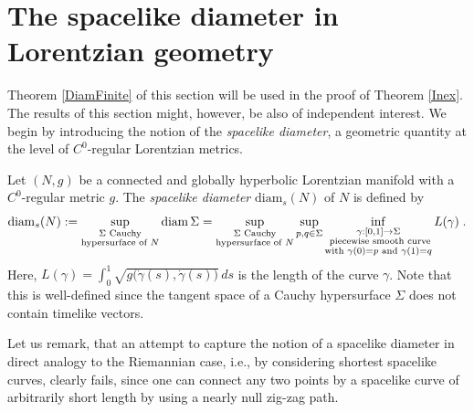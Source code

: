 \documentclass[reqno]{article}
\newcommand{\diam}{\mathrm{diam}}
\begin{document}
\section{The spacelike diameter in Lorentzian geometry}
\label{SecDiam}

Theorem \ref{DiamFinite} of this section will be used in the proof of Theorem \ref{Inex}. The results of this section might, however, be also of independent interest. We begin by introducing the notion of the \emph{spacelike diameter}, a geometric quantity at the level of $C^0$-regular Lorentzian metrics.

\begin{definition}\label{schwdef:spacelike_diameter}
Let $(N,g)$ be a connected  and globally hyperbolic Lorentzian manifold with a $C^0$-regular metric $g$. The \emph{spacelike diameter}  $\diam_s(N)$ of $N$ is defined by 
\begin{equation*}
\diam_s(N) := \sup_{\substack{\Sigma \textnormal{ Cauchy} \\ \textnormal{hypersurface of } N}} \diam\, \Sigma = \sup_{\substack{\Sigma \textnormal{ Cauchy} \\  \textnormal{hypersurface of } N}} \sup_{p,q \in \Sigma} \inf_{\substack{\gamma : [0,1] \to \Sigma \\ \textnormal{ piecewise smooth curve} \\  \textnormal{with } \gamma(0) = p \textnormal{ and } \gamma(1) = q}} L(\gamma)\;.
\end{equation*}
Here, $L(\gamma) = \int_0^1 \sqrt{g\big(\dot{\gamma}(s), \dot{\gamma}(s)\big)} \, ds $ is the length of the curve $\gamma$. Note that this is well-defined since the tangent space of a Cauchy hypersurface $\Sigma$ does not contain timelike vectors.
\end{definition}

Let us remark, that an attempt to capture the notion of a spacelike diameter in direct analogy to the Riemannian case, i.e., by considering shortest spacelike curves, clearly fails, since one can connect any two points by a spacelike curve of arbitrarily short length by using a nearly null zig-zag path. 
\end{document}
